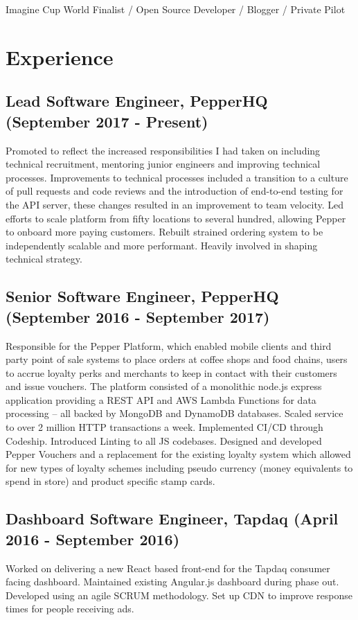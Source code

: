 \documentclass[10pt,letterpaper]{article}
\begin{document}

	\noindent Imagine Cup World Finalist / Open Source Developer / Blogger / Private Pilot

	\noindent\makebox[\linewidth]{\rule{\textwidth}{0.4pt}}
	
	\section*{Experience}
	\subsection*{Lead Software Engineer, PepperHQ \small{(September 2017 - Present)}}
	Promoted to reflect the increased responsibilities I had taken on including technical recruitment, mentoring junior engineers and improving technical processes. Improvements to technical processes included a transition to a culture of pull requests and code reviews and the introduction of end-to-end testing for the API server, these changes resulted in an improvement to team velocity. Led efforts to scale platform from fifty locations to several hundred, allowing Pepper to onboard more paying customers. Rebuilt strained ordering system to be independently scalable and more performant. Heavily involved in shaping technical strategy.
	
	\subsection*{Senior Software Engineer, PepperHQ \small{(September 2016 - September 2017)}}
	Responsible for the Pepper Platform, which enabled mobile clients and third party point of sale systems to place orders at coffee shops and food chains, users to accrue loyalty perks and merchants to keep in contact with their customers and issue vouchers. The platform consisted of a monolithic node.js express application providing a REST API and AWS Lambda Functions for data processing -- all backed by MongoDB and DynamoDB databases. Scaled service to over 2 million HTTP transactions a week. Implemented CI/CD through Codeship. Introduced Linting to all JS codebases. Designed and developed Pepper Vouchers and a replacement for the existing loyalty system which allowed for new types of loyalty schemes including pseudo currency (money equivalents to spend in store) and product specific stamp cards.
	
	\subsection*{Dashboard Software Engineer, Tapdaq \small{(April 2016 - September 2016)}}
	Worked on delivering a new React based front-end for the Tapdaq consumer facing dashboard. Maintained existing Angular.js dashboard during phase out. Developed using an agile SCRUM methodology. Set up CDN to improve response times for people receiving ads.
	
\end{document}
